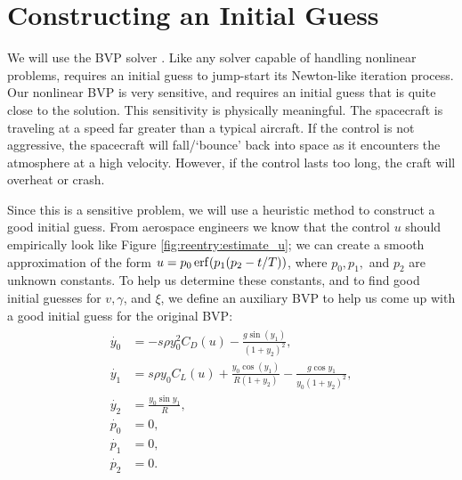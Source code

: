 \section*{Constructing an Initial Guess}
We will use the BVP solver . 
Like any solver capable of handling nonlinear problems,  requires an initial guess to jump-start its Newton-like iteration process. 
Our nonlinear BVP is very sensitive, and requires an initial guess that is quite close to the solution.  
This sensitivity is physically meaningful. The spacecraft is traveling at a speed far greater than a typical aircraft. If the control is not aggressive, the spacecraft will fall/`bounce' back into space as it encounters the atmosphere at a high velocity. 
However, if the control lasts too long, the craft will overheat or crash.

Since this is a sensitive problem, we will use a heuristic method to  construct a good initial guess.
From aerospace engineers we know that the control $u$ should empirically look like Figure \ref{fig:reentry:estimate_u}; 
we can create a smooth approximation of the form $u = p_0\operatorname{erf}(p_1(p_2-t/T))$, where $p_0, p_1,$ and $p_2$ are unknown constants. 
To help us determine these constants, and to find good initial guesses for $v, \gamma$, and $\xi$, we define an auxiliary BVP to help us come up with a good initial guess for the original BVP:
\begin{align}
\begin{split}
\dot{y_0} &= -s\rho y_0^2C_D(u) - \frac{g\sin(y_1)}{(1+y_2)^2},\\
\dot{y_1} &= s \rho y_0 C_L(u) + \frac{y_0 \cos(y_1)}{R(1+y_2)} - \frac{g \cos y_1}{y_0(1+y_2)^2},\\
\dot{y_2} &= \frac{y_0 \sin y_1}{R} ,\\
\dot{p_0} &= 0, \\
\dot{p_1} &= 0, \\
\dot{p_2} &= 0.
\end{split} \label{eqn:reentry:control_system_auxiliary}
\end{align}

